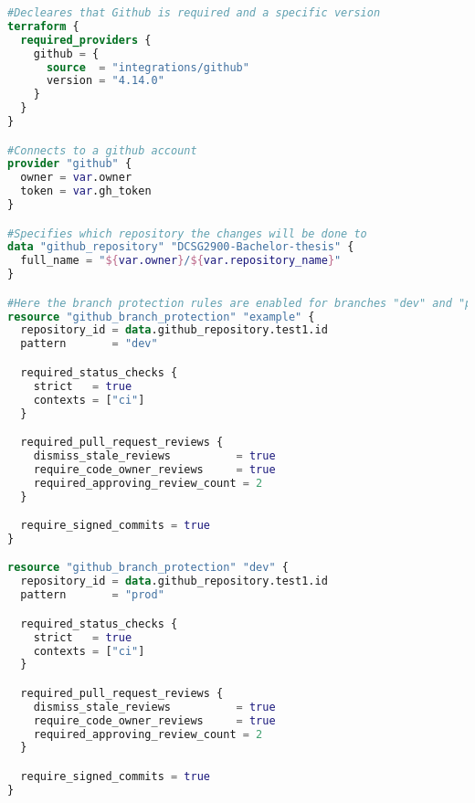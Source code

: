 \label{branchprotectionrules}
\begin{lstlisting}[language=terraform, caption=Enable branch protection]
#Decleares that Github is required and a specific version
terraform {
  required_providers {
    github = {
      source  = "integrations/github"
      version = "4.14.0"
    }
  }
}

#Connects to a github account 
provider "github" {
  owner = var.owner
  token = var.gh_token
}

#Specifies which repository the changes will be done to
data "github_repository" "DCSG2900-Bachelor-thesis" {
  full_name = "${var.owner}/${var.repository_name}"
}

#Here the branch protection rules are enabled for branches "dev" and "prod"
resource "github_branch_protection" "example" {
  repository_id = data.github_repository.test1.id
  pattern       = "dev"

  required_status_checks {
    strict   = true
    contexts = ["ci"]
  }

  required_pull_request_reviews {
    dismiss_stale_reviews          = true
    require_code_owner_reviews     = true
    required_approving_review_count = 2
  }

  require_signed_commits = true
}

resource "github_branch_protection" "dev" {
  repository_id = data.github_repository.test1.id
  pattern       = "prod"

  required_status_checks {
    strict   = true
    contexts = ["ci"]
  }

  required_pull_request_reviews {
    dismiss_stale_reviews          = true
    require_code_owner_reviews     = true
    required_approving_review_count = 2
  }

  require_signed_commits = true
}
\end{lstlisting}